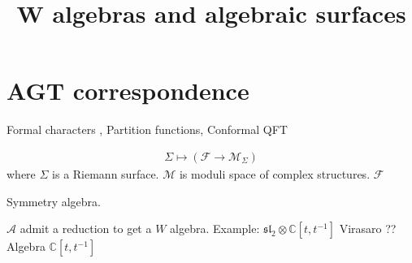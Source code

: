 % 


\title{W algebras and algebraic surfaces}
\author{}
\date{}

 
\maketitle

\section{AGT correspondence} %

Formal characters , Partition functions, Conformal QFT

\begin{align}
    \Sigma \mapsto ( \mathcal{F} \rightarrow \mathcal{M}_\Sigma) 
\end{align}
where $\Sigma $ is a Riemann surface. 
$\mathcal{M} $ is moduli space of complex structures. 
$ \mathcal{F} $ 

Symmetry algebra. 

$\mathcal{A} $ admit a reduction to get a $W$ algebra. 
Example: 
$\mathfrak{sl}_2 \otimes \mathbb{C} [t, t^{-1} ] $ 
Virasaro ?? Algebra $ \mathbb{C} [t, t^{-1} ] $ 










 

